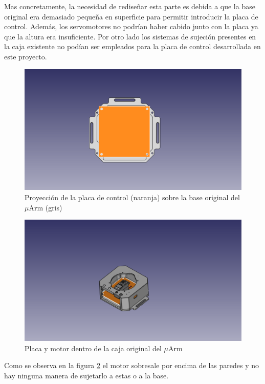  Mas concretamente, la necesidad de rediseñar esta parte es debida a que la base original era demasiado pequeña en superficie para permitir introducir la placa de control. Además, los servomotores no podrían haber cabido junto con la placa ya que la altura era insuficiente. Por otro lado los sistemas de sujeción presentes en la caja existente no podían ser empleados para la placa de control desarrollada en este proyecto.
 
 \begin{figure}[H]
    \centering
    \includegraphics[width=.9\linewidth]{pictures/PlacaYBase.png}
    \caption{Proyección de la placa de control (naranja) sobre la base original del $\mu$Arm (gris)}
    \label{fig:placa_y_base_antiguas}
\end{figure}


 \begin{figure}[H]
    \centering
    \includegraphics[width=.9\linewidth]{pictures/PlacaMotorYParedes1.png}
    \caption{Placa y motor dentro de la caja original del $\mu$Arm}
    \label{fig:placa_motor_y_paredes1}
\end{figure}

Como se observa en la figura \ref{fig:placa_motor_y_paredes1} el motor sobresale por encima de las paredes y no hay ninguna manera de sujetarlo a estas o a la base.

